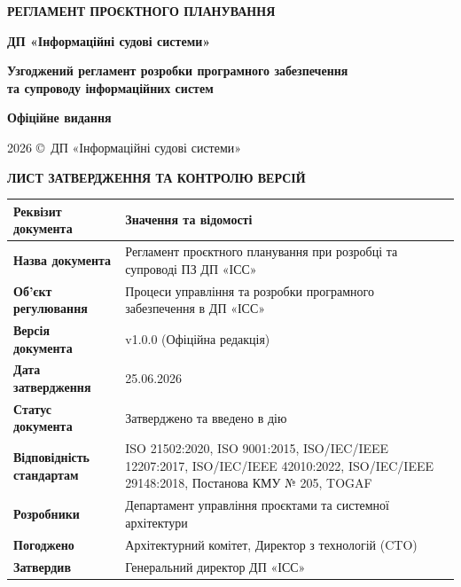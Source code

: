 \documentclass{article}
\newcommand\HUGE[1]{\fontsize{40}{40}\selectfont #1}
\begin{document}
\pagestyle{fancy}

\begin{titlepage}
  \AddToShipoutPictureBG*{\AtPageLowerLeft{\color{nato}\rule{\paperwidth}{\paperheight}}}
  \color{white}\thispagestyle{empty}\vspace*{3cm}\centering
  {\Huge \textbf{РЕГЛАМЕНТ ПРОЄКТНОГО ПЛАНУВАННЯ} \par} \vspace{1cm}
  {\HUGE \textbf{ДП «Інформаційні судові системи»} \par} \vspace{2cm}
  {\LARGE \textbf{Узгоджений регламент розробки програмного забезпечення \\ та супроводу інформаційних систем} \par} \vspace{1.5cm}
  {\large\textbf{Офіційне видання} \par}
  \vfill
  {\large 2026 \copyright\ ДП «Інформаційні судові системи» \par}
\end{titlepage}

\newpage
\thispagestyle{empty}
\begin{center}
  {\Large\color{nato}\bfseries ЛИСТ ЗАТВЕРДЖЕННЯ ТА КОНТРОЛЮ ВЕРСІЙ\par}
\end{center}
\vspace{20pt}

\begin{longtable}{@{}p{4.0cm}p{10.2cm}@{}}
\toprule
\textbf{Реквізит документа} & \textbf{Значення та відомості} \\
\midrule
\textbf{Назва документа} & Регламент проєктного планування при розробці та супроводі ПЗ ДП «ІСС» \\
\textbf{Об'єкт регулювання} & Процеси управління та розробки програмного забезпечення в ДП «ІСС» \\
\textbf{Версія документа} & v1.0.0 (Офіційна редакція) \\
\textbf{Дата затвердження} & 25.06.2026 \\
\textbf{Статус документа} & Затверджено та введено в дію \\
\textbf{Відповідність стандартам} & ISO 21502:2020, ISO 9001:2015, ISO/IEC/IEEE 12207:2017, ISO/IEC/IEEE 42010:2022, ISO/IEC/IEEE 29148:2018, Постанова КМУ № 205, TOGAF \\
\textbf{Розробники} & Департамент управління проєктами та системної архітектури \\
\textbf{Погоджено} & Архітектурний комітет, Директор з технологій (CTO) \\
\textbf{Затвердив} & Генеральний директор ДП «ІСС» \\
\bottomrule
\end{longtable}
\end{document}
